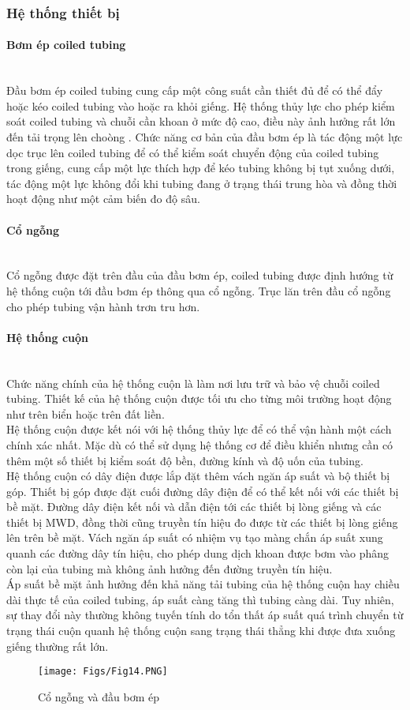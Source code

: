 \documentclass[12pt,a4paper]{article}
\newcommand{\subsubsubsection}[1]{\paragraph{#1}\mbox{}\\}
\begin{document}
	\subsubsection{Hệ thống thiết bị}
	\subsubsubsection{Bơm ép coiled tubing}
	Đầu bơm ép coiled tubing cung cấp một công suất cần thiết đủ để có thể đẩy hoặc kéo coiled tubing vào hoặc ra khỏi giếng. Hệ thống thủy lực cho phép kiểm soát coiled tubing và chuỗi cần khoan ở mức độ cao, điều này ảnh hưởng rất lớn đến tải trọng lên choòng . Chức năng cơ bản của đầu bơm ép là tác động một lực dọc trục lên coiled tubing để có thể kiểm soát chuyển động của coiled tubing trong giếng, cung cấp một lực thích hợp để kéo tubing không bị tụt xuống dưới, tác động một lực không đổi khi tubing đang ở trạng thái trung hòa và đồng thời hoạt động như một cảm biến đo độ sâu. 
	\subsubsubsection{Cổ ngỗng}
	Cổ ngỗng được đặt trên đầu của đầu bơm ép, coiled tubing được định hướng từ hệ thống cuộn tới đầu bơm ép thông qua cổ ngỗng. Trục lăn trên đầu cổ ngỗng cho phép tubing vận hành trơn tru hơn.
	\subsubsubsection{Hệ thống cuộn}
	Chức năng chính của hệ thống cuộn là làm nơi lưu trữ và bảo vệ chuỗi coiled tubing. Thiết kế của hệ thống cuộn được tối ưu cho từng môi trường hoạt động như trên biển hoặc trên đất liền.\\
	Hệ thống cuộn được kết nói với hệ thống thủy lực để có thể vận hành một cách chính xác nhất. Mặc dù có thể sử dụng hệ thống cơ để điều khiển nhưng cần có thêm một số thiết bị kiểm soát độ bền, đường kính và độ uốn của tubing. \\
	Hệ thống cuộn có dây điện được lắp đặt thêm vách ngăn áp suất và bộ thiết bị góp. Thiết bị góp được đặt cuối đường dây điện để có thể kết nối với các thiết bị bề mặt. Đường dây điện kết nối và dẫn điện tới các thiết bị lòng giếng và các thiết bị MWD, đồng thời cũng truyền tín hiệu đo được từ các thiết bị lòng giếng lên trên bề mặt. Vách ngăn áp suất có nhiệm vụ tạo màng chắn áp suất xung quanh các đường dây tín hiệu, cho phép dung dịch khoan được bơm vào phâng còn lại của tubing mà không ảnh hưởng đến đường truyền tín hiệu. \\
	Áp suất bề mặt ảnh hưởng đến khả năng tải tubing của hệ thống cuộn hay chiều dài thực tế của coiled tubing, áp suất càng tăng thì tubing càng dài. Tuy nhiên, sự thay đổi này thường không tuyến tính do tổn thất áp suất quá trình chuyển từ trạng thái cuộn quanh hệ thống cuộn sang trạng thái thẳng khi được đưa xuống giếng thường rất lớn. \\
	\begin{figure}[h]
	\centering
	\texttt{[image: Figs/Fig14.PNG]}
	\caption{Cổ ngỗng và đầu bơm ép\cite{rehm2013underbalanced}}
	\end{figure}
\end{document}

